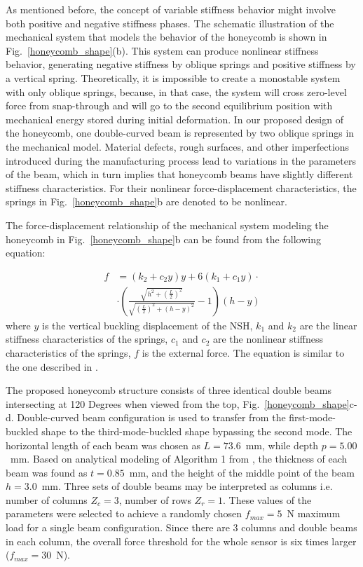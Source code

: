 \documentclass[lettersize,journal]{IEEEtran}
\begin{document}
As mentioned before, the concept of variable stiffness behavior might involve both positive and negative stiffness phases. The schematic illustration of the mechanical system that models the behavior of the honeycomb is shown in Fig.~\ref{honeycomb_shape}(b). This system can produce nonlinear stiffness behavior, generating negative stiffness by oblique springs and positive stiffness by a vertical spring. Theoretically, it is impossible to create a monostable system with only oblique springs, because, in that case, the system will cross zero-level force from snap-through and will go to the second equilibrium position with mechanical energy stored during initial deformation. In our proposed design of the honeycomb, one double-curved beam is represented by two oblique springs in the mechanical model. Material defects, rough surfaces, and other imperfections introduced during the manufacturing process lead to variations in the parameters of the beam, which in turn implies that honeycomb beams have slightly different stiffness characteristics. For their nonlinear force-displacement characteristics, the springs in Fig.~\ref{honeycomb_shape}b are denoted to be nonlinear.

The force-displacement relationship of the mechanical system modeling the honeycomb in Fig.~\ref{honeycomb_shape}b can be found from the following equation:

\begin{equation}\label{eq:eq2}
\begin{aligned}
f&=(k_2+c_2{y})y + 6(k_1+c_1{y})\cdot \\ &\cdot \left( \frac{\sqrt{h^2+(\frac{L}{2})^2}}{\sqrt{(\frac{L}{2})^2+(h-y)^2}}-1\right)(h-y)
\end{aligned}
\end{equation}
where $y$ is the vertical buckling displacement of the NSH, $k_1$ and $k_2$ are the linear stiffness characteristics of the springs, $c_1$ and $c_2$ are the nonlinear stiffness characteristics of the springs, $f$ is the external force. The equation is similar to the one described in \cite{li2020negative, dalela2022design, lan2014design}.

The proposed honeycomb structure consists of three identical double beams intersecting at 120 Degrees when viewed from the top, Fig.~\ref{honeycomb_shape}c-d. Double-curved beam configuration is used to transfer from the first-mode-buckled shape to the third-mode-buckled shape bypassing the second mode. The horizontal length of each beam was chosen as $L = 73.6$~mm, while depth $p = 5.00$~mm. Based on analytical modeling of Algorithm 1 from \cite{zhakatayev2020analytical}, the thickness of each beam was found as $t = 0.85$~mm, and the height of the middle point of the beam $h = 3.0$~mm. Three sets of double beams may be interpreted as columns i.e. number of columns $Z_c = 3$, number of rows $Z_r = 1$. These values of the parameters were selected to achieve a randomly chosen $f_{max}=5$~N maximum load for a single beam configuration. Since there are 3 columns and double beams in each column, the overall force threshold for the whole sensor is six times larger ($f_{max}=30$~N). 
\end{document}
